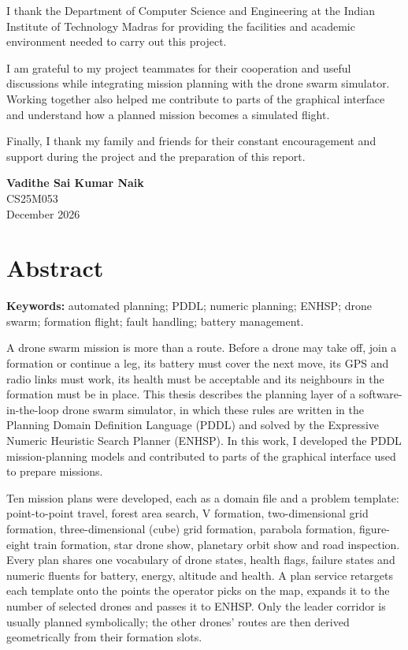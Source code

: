 \documentclass[11pt,a4paper,oneside]{report}
\newcommand{\authorname}{Vadithe Sai Kumar Naik}
\newcommand{\rollno}{CS25M053}
\newcommand{\addfront}[1]{%
  \addtocontents{toc}{\protect\noindent\protect\rule{0pt}{1.5em}\protect\textbf{#1}\protect\hfill\protect\textbf{\thepage}\protect\par}}
\begin{document}
I thank the Department of Computer Science and Engineering at the Indian
Institute of Technology Madras for providing the facilities and academic
environment needed to carry out this project.

I am grateful to my project teammates for their cooperation and useful
discussions while integrating mission planning with the drone swarm simulator.
Working together also helped me contribute to parts of the graphical interface
and understand how a planned mission becomes a simulated flight.

Finally, I thank my family and friends for their constant encouragement and
support during the project and the preparation of this report.

\begin{flushright}
\textbf{\authorname}\\
\rollno\\
December 2026
\end{flushright}

\chapter*{Abstract}
\addfront{ABSTRACT}
\noindent\textbf{Keywords:} automated planning; PDDL; numeric planning; ENHSP; drone swarm;
formation flight; fault handling; battery management.

\medskip
A drone swarm mission is more than a route. Before a drone may take off, join a formation or
continue a leg, its battery must cover the next move, its GPS and radio links must work, its
health must be acceptable and its neighbours in the formation must be in place. This thesis
describes the planning layer of a software-in-the-loop drone swarm simulator, in which these
rules are written in the Planning Domain Definition Language (PDDL) and solved by the
Expressive Numeric Heuristic Search Planner (ENHSP). In this work, I developed the PDDL mission-planning models and contributed to
parts of the graphical interface used to prepare missions.

Ten mission plans were developed, each as a domain file and a problem template: point-to-point
travel, forest area search, V formation, two-dimensional grid formation, three-dimensional
(cube) grid formation, parabola formation, figure-eight train formation, star drone show,
planetary orbit show and road inspection. Every plan shares one vocabulary of drone states,
health flags, failure states and numeric fluents for battery, energy, altitude and health. A
plan service retargets each template onto the points the operator picks on the map, expands it
to the number of selected drones and passes it to ENHSP. Only the leader corridor is usually
planned symbolically; the other drones' routes are then derived geometrically from their
formation slots.
\end{document}
